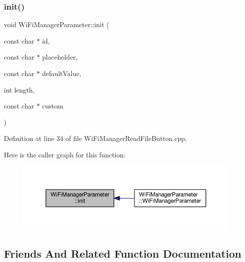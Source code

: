 \mbox{\label{class_wi_fi_manager_parameter_a137b764027d3851a428f3ab185a5660f}} 
\subsubsection{\texorpdfstring{init()}{init()}}
{\footnotesize\ttfamily void Wi\+Fi\+Manager\+Parameter\+::init (\begin{DoxyParamCaption}\item[{const char $\ast$}]{id,  }\item[{const char $\ast$}]{placeholder,  }\item[{const char $\ast$}]{default\+Value,  }\item[{int}]{length,  }\item[{const char $\ast$}]{custom }\end{DoxyParamCaption})\hspace{0.3cm}{\ttfamily [private]}}



Definition at line 34 of file Wi\+Fi\+Manager\+Read\+File\+Button.\+cpp.

Here is the caller graph for this function\+:
\nopagebreak
\begin{figure}[H]
\begin{center}
\leavevmode
\includegraphics[width=350pt]{class_wi_fi_manager_parameter_a137b764027d3851a428f3ab185a5660f_icgraph}
\end{center}
\end{figure}


\subsection{Friends And Related Function Documentation}
\mbox{\label{class_wi_fi_manager_parameter_a56d1e08e3880a330575332abac06e6c8}} 
